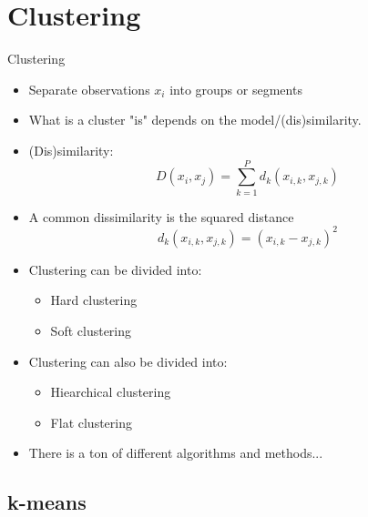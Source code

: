 \documentclass[10pt]{beamer}
\begin{document}
\section{Clustering}
\frame{\sectionpage}

\begin{frame}{Clustering}
\begin{itemize}
\item Separate observations $x_i$ into {\color{uured} groups} or {\color{uured} segments}\pause
\item What is a cluster "is" depends on the {\color{uured} model/(dis)similarity}.
\item (Dis)similarity:
\[
D(x_i, x_j) = \sum_{k = 1}^P d_k(x_{i,k}, x_{j,k})
\]
\item A common dissimilarity is the squared distance
\[
d_k(x_{i,k}, x_{j,k}) = (x_{i,k} - x_{j,k})^2
\]
\pause
\item Clustering can be divided into:
\begin{itemize}
\item {\color{uured} Hard} clustering%
\item {\color{uured} Soft} clustering%
\end{itemize}
\pause
\item Clustering can also be divided into:
\begin{itemize}
\item {\color{uured} Hiearchical} clustering
\item {\color{uured} Flat} clustering
\end{itemize}
\pause
\item There is a ton of different algorithms and methods...
\end{itemize}

\end{frame}

\subsection{k-means}
\end{document}
